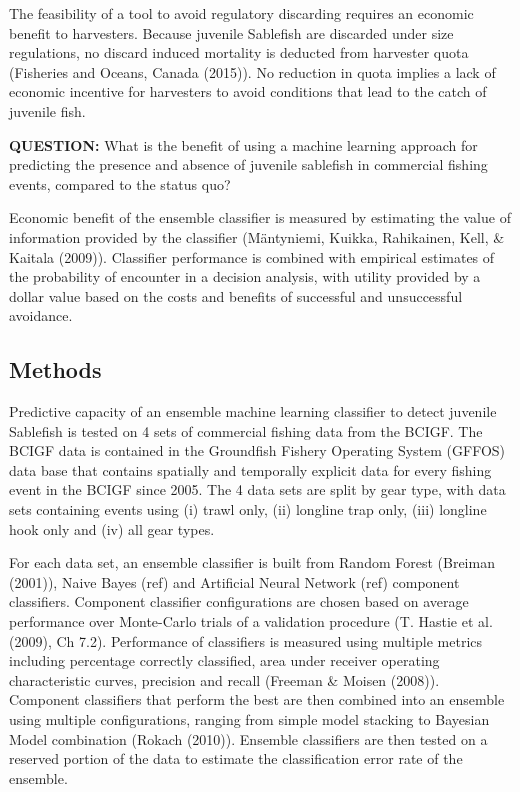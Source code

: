 \documentclass[12pt,]{scrartcl}
\begin{document}
The feasibility of a tool to avoid regulatory discarding requires an
economic benefit to harvesters. Because juvenile Sablefish are discarded
under size regulations, no discard induced mortality is deducted from
harvester quota (Fisheries and Oceans, Canada (2015)). No reduction in
quota implies a lack of economic incentive for harvesters to avoid
conditions that lead to the catch of juvenile fish.

\textbf{QUESTION:} What is the benefit of using a machine learning
approach for predicting the presence and absence of juvenile sablefish
in commercial fishing events, compared to the status quo?

Economic benefit of the ensemble classifier is measured by estimating
the value of information provided by the classifier (Mäntyniemi, Kuikka,
Rahikainen, Kell, \& Kaitala (2009)). Classifier performance is combined
with empirical estimates of the probability of encounter in a decision
analysis, with utility provided by a dollar value based on the costs and
benefits of successful and unsuccessful avoidance.

\subsection{Methods}\label{methods-3}

Predictive capacity of an ensemble machine learning classifier to detect
juvenile Sablefish is tested on 4 sets of commercial fishing data from
the BCIGF. The BCIGF data is contained in the Groundfish Fishery
Operating System (GFFOS) data base that contains spatially and
temporally explicit data for every fishing event in the BCIGF since
2005. The 4 data sets are split by gear type, with data sets containing
events using (i) trawl only, (ii) longline trap only, (iii) longline
hook only and (iv) all gear types.

For each data set, an ensemble classifier is built from Random Forest
(Breiman (2001)), Naive Bayes (ref) and Artificial Neural Network (ref)
component classifiers. Component classifier configurations are chosen
based on average performance over Monte-Carlo trials of a validation
procedure (T. Hastie et al. (2009), Ch 7.2). Performance of classifiers
is measured using multiple metrics including percentage correctly
classified, area under receiver operating characteristic curves,
precision and recall (Freeman \& Moisen (2008)). Component classifiers
that perform the best are then combined into an ensemble using multiple
configurations, ranging from simple model stacking to Bayesian Model
combination (Rokach (2010)). Ensemble classifiers are then tested on a
reserved portion of the data to estimate the classification error rate
of the ensemble.
\end{document}
